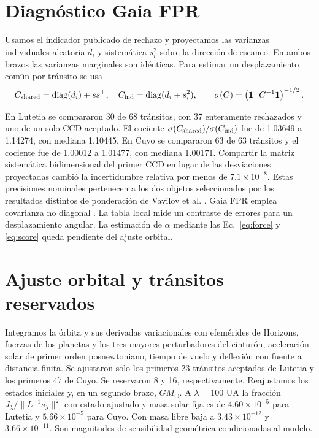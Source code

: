 \documentclass[11pt,a4paper]{article}
\begin{document}
\section{Diagnóstico Gaia FPR}
Usamos el indicador publicado de rechazo y proyectamos las varianzas individuales aleatoria $d_i$ y sistemática $s_i^2$ sobre la dirección de escaneo. En ambos brazos las varianzas marginales son idénticas. Para estimar un desplazamiento común por tránsito se usa
\begin{equation}
C_{\rm shared}=\operatorname{diag}(d_i)+ss^\top,\quad
C_{\rm ind}=\operatorname{diag}(d_i+s_i^2),\qquad
\sigma(C)=\left(\mathbf{1}^\top C^{-1}\mathbf{1}\right)^{-1/2}.
\label{eq:gaia}
\end{equation}

En Lutetia se compararon 30 de 68 tránsitos, con 37 enteramente rechazados y uno de un solo CCD aceptado. El cociente $\sigma(C_{\rm shared})/\sigma(C_{\rm ind})$ fue de 1.03649 a 1.14274, con mediana 1.10445. En Cuyo se compararon 63 de 63 tránsitos y el cociente fue de 1.00012 a 1.01477, con mediana 1.00171. Compartir la matriz sistemática bidimensional del primer CCD en lugar de las desviaciones proyectadas cambió la incertidumbre relativa por menos de $7.1\times10^{-8}$. Estas precisiones nominales pertenecen a los dos objetos seleccionados por los resultados distintos de ponderación de Vavilov et al. \cite{vavilov}. Gaia FPR emplea covarianza no diagonal \cite{gaia}. La tabla local mide un contraste de errores para un desplazamiento angular. La estimación de $\alpha$ mediante las Ec.~\eqref{eq:force} y \eqref{eq:score} queda pendiente del ajuste orbital.

\section{Ajuste orbital y tránsitos reservados}
Integramos la órbita y sus derivadas variacionales con efemérides de Horizons, fuerzas de los planetas y los tres mayores perturbadores del cinturón, aceleración solar de primer orden posnewtoniano, tiempo de vuelo y deflexión con fuente a distancia finita. Se ajustaron solo los primeros 23 tránsitos aceptados de Lutetia y los primeros 47 de Cuyo. Se reservaron 8 y 16, respectivamente. Reajustamos los estados iniciales y, en un segundo brazo, $GM_\odot$. A $\lambda=100$ UA la fracción $J_\lambda/\|L^{-1}s_\lambda\|^2$ con estado ajustado y masa solar fija es de $4.60\times10^{-5}$ para Lutetia y $5.66\times10^{-5}$ para Cuyo. Con masa libre baja a $3.43\times10^{-12}$ y $3.66\times10^{-11}$. Son magnitudes de sensibilidad geométrica condicionadas al modelo.
\end{document}
